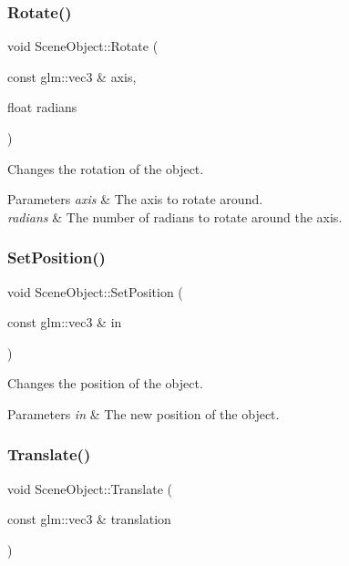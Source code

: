 \subsubsection{\texorpdfstring{Rotate()}{Rotate()}}
{\footnotesize\ttfamily void Scene\+Object\+::\+Rotate (\begin{DoxyParamCaption}\item[{const glm\+::vec3 \&}]{axis,  }\item[{float}]{radians }\end{DoxyParamCaption})}



Changes the rotation of the object.


\begin{DoxyParams}{Parameters}
{\em axis} & The axis to rotate around. \\
\hline
{\em radians} & The number of radians to rotate around the axis. \\
\hline
\end{DoxyParams}
\hypertarget{class_scene_object_a1903672e77e88a1e220fcfa8e6afc1d4}{}\label{class_scene_object_a1903672e77e88a1e220fcfa8e6afc1d4}
\subsubsection{\texorpdfstring{Set\+Position()}{SetPosition()}}
{\footnotesize\ttfamily void Scene\+Object\+::\+Set\+Position (\begin{DoxyParamCaption}\item[{const glm\+::vec3 \&}]{in }\end{DoxyParamCaption})}



Changes the position of the object.


\begin{DoxyParams}{Parameters}
{\em in} & The new position of the object. \\
\hline
\end{DoxyParams}
\hypertarget{class_scene_object_a04868377580069b0ee9d202bdb1b7159}{}\label{class_scene_object_a04868377580069b0ee9d202bdb1b7159}
\subsubsection{\texorpdfstring{Translate()}{Translate()}}
{\footnotesize\ttfamily void Scene\+Object\+::\+Translate (\begin{DoxyParamCaption}\item[{const glm\+::vec3 \&}]{translation }\end{DoxyParamCaption})}



